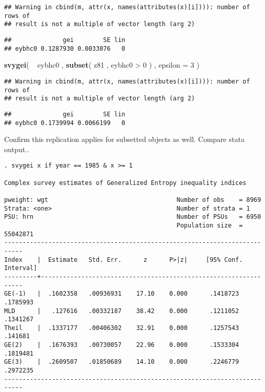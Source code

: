 \documentclass[]{book}
\newenvironment{Shaded}{\begin{snugshade}}{\end{snugshade}}
\newcommand{\KeywordTok}[1]{\textcolor[rgb]{0.13,0.29,0.53}{\textbf{{#1}}}}
\newcommand{\DataTypeTok}[1]{\textcolor[rgb]{0.13,0.29,0.53}{{#1}}}
\newcommand{\DecValTok}[1]{\textcolor[rgb]{0.00,0.00,0.81}{{#1}}}
\newcommand{\StringTok}[1]{\textcolor[rgb]{0.31,0.60,0.02}{{#1}}}
\newcommand{\NormalTok}[1]{{#1}}
\begin{document}
\begin{verbatim}
## Warning in cbind(m, attr(x, names(attributes(x)[i]))): number of rows of
## result is not a multiple of vector length (arg 2)
\end{verbatim}

\begin{verbatim}
##              gei        SE lin
## eybhc0 0.1287930 0.0033076   0
\end{verbatim}

\begin{Shaded}
\begin{Highlighting}[]
\KeywordTok{svygei}\NormalTok{( ~}\StringTok{ }\NormalTok{eybhc0 , }\KeywordTok{subset}\NormalTok{( z81 , eybhc0 >}\StringTok{ }\DecValTok{0} \NormalTok{) , }\DataTypeTok{epsilon =} \DecValTok{3} \NormalTok{)}
\end{Highlighting}
\end{Shaded}

\begin{verbatim}
## Warning in cbind(m, attr(x, names(attributes(x)[i]))): number of rows of
## result is not a multiple of vector length (arg 2)
\end{verbatim}

\begin{verbatim}
##              gei        SE lin
## eybhc0 0.1739994 0.0066199   0
\end{verbatim}

Confirm this replication applies for subsetted objects as well. Compare
stata output..

\begin{verbatim}
. svygei x if year == 1985 & x >= 1

Complex survey estimates of Generalized Entropy inequality indices
 
pweight: wgt                                   Number of obs    = 8969
Strata: <one>                                  Number of strata = 1
PSU: hrn                                       Number of PSUs   = 6950
                                               Population size  = 55042871
---------------------------------------------------------------------------
Index    |  Estimate   Std. Err.      z      P>|z|     [95% Conf. Interval]
---------+-----------------------------------------------------------------
GE(-1)   |  .1602358   .00936931    17.10    0.000      .1418723   .1785993
MLD      |   .127616   .00332187    38.42    0.000      .1211052   .1341267
Theil    |  .1337177   .00406302    32.91    0.000      .1257543    .141681
GE(2)    |  .1676393   .00730057    22.96    0.000      .1533304   .1819481
GE(3)    |  .2609507   .01850689    14.10    0.000      .2246779   .2972235
---------------------------------------------------------------------------
\end{verbatim}
\end{document}
